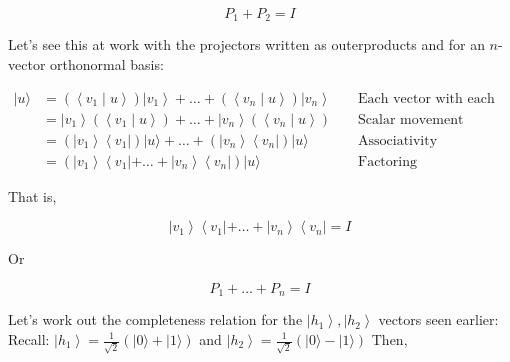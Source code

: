 \documentclass[main.tex]{subfiles}
\begin{document}
    $$
    P_{1}+P_{2}=I
    $$
    
    Let's see this at work with the projectors written as outerproducts and for an $n$-vector orthonormal basis:
    
    $$
    \begin{aligned}
    |u\rangle &=\left(\left\langle v_{1} \mid u\right\rangle\right)\left|v_{1}\right\rangle+\ldots+\left(\left\langle v_{n} \mid u\right\rangle\right)\left|v_{n}\right\rangle & & \text { Each vector with each coefficient } \\
    &=\left|v_{1}\right\rangle\left(\left\langle v_{1} \mid u\right\rangle\right)+\ldots+\left|v_{n}\right\rangle\left(\left\langle v_{n} \mid u\right\rangle\right) & & \text { Scalar movement } \\
    &=\left(\left|v_{1}\right\rangle\left\langle v_{1}\right|\right)|u\rangle+\ldots+\left(\left|v_{n}\right\rangle\left\langle v_{n}\right|\right)|u\rangle & & \text { Associativity } \\
    &=\left(\left|v_{1}\right\rangle\left\langle v_{1}|+\ldots+| v_{n}\right\rangle\left\langle v_{n}\right|\right)|u\rangle & & \text { Factoring }
    \end{aligned}
    $$
    
    That is,
    
    $$
    \left|v_{1}\right\rangle\left\langle v_{1}|+\ldots+| v_{n}\right\rangle\left\langle v_{n}\right|=I
    $$
    
    $\mathrm{Or}$
    
    $$
    P_{1}+\ldots+P_{n}=I
    $$
    
    Let's work out the completeness relation for the $\left|h_{1}\right\rangle,\left|h_{2}\right\rangle$ vectors seen earlier: Recall: $\left|h_{1}\right\rangle=\frac{1}{\sqrt{2}}(|0\rangle+|1\rangle)$ and $\left|h_{2}\right\rangle=\frac{1}{\sqrt{2}}(|0\rangle-|1\rangle)$ Then,
    
\end{document}
